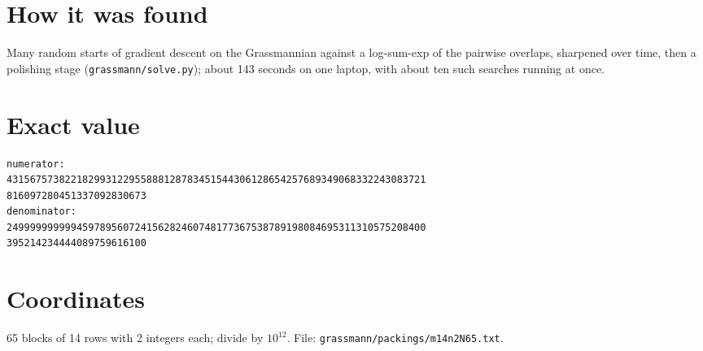 \documentclass[11pt,a4paper]{article}
\begin{document}
\section{How it was found}
Many random starts of gradient descent on the Grassmannian against a log-sum-exp of the pairwise overlaps, sharpened over time, then a polishing stage (\texttt{grassmann/solve.py}); about 143 seconds on one laptop, with about ten such searches running at once.


\appendix
\section{Exact value}
{\small
\begin{verbatim}
numerator:
431567573822182993122955888128783451544306128654257689349068332243083721
816097280451337092830673
denominator:
249999999999459789560724156282460748177367538789198084695311310575208400
395214234444089759616100
\end{verbatim}}

\section{Coordinates}
65 blocks of 14 rows with 2 integers each; divide by $10^{12}$. File: \texttt{grassmann/packings/m14n2N65.txt}.
{\tiny
\begin{multicols}{4}
\end{multicols}}
\end{document}
